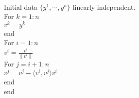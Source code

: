 \documentclass[letterpaper]{article}
\begin{document}
\\
Initial data $\{y^1,\dotsb,y^n\}$ linearly independent.\\
    For $k=1:n$\\
    \indent\hspace{4ex}$v^k=y^k$\\
    end\\
    For $i=1:n$\\
    \indent\hspace{4ex}$v^i=\frac{v^i}{\|v^i\|}$\\
    \indent\hspace{4ex}For $j=i+1:n$\\
    \indent\hspace{8ex}$v^j=v^j-\langle v^i,v^j\rangle v^i$\\
    \indent\hspace{4ex}end\\
    end
\end{document}
